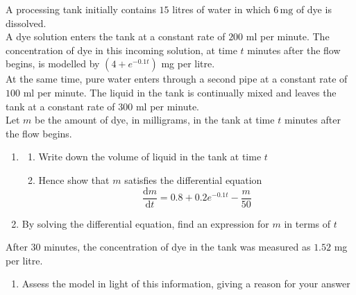 \documentclass[leqno]{article}
\begin{document}
\begin{enumerate}[
  label=\textbf{\arabic*.},
  leftmargin=*,
  topsep=0pt,
  partopsep=0pt,
  parsep=0pt
]
\newpage

\questionitem

A processing tank initially contains $15$ litres of water in which $6\,\mathrm{mg}$ of dye is dissolved. \\

A dye solution enters the tank at a constant rate of $200$ ml per minute. The concentration of dye in this incoming solution, at time $t$ minutes after the flow begins, is modelled by $(4+e^{-0.1t})$ mg per litre. \\

At the same time, pure water enters through a second pipe at a constant rate of $100$ ml per minute. The liquid in the tank is continually mixed and leaves the tank at a constant rate of $300$ ml per minute. \\

Let $m$ be the amount of dye, in milligrams, in the tank at time $t$ minutes after the flow begins. \\
\begin{enumerate}[label=\textbf{(\alph*)}]
  \item 
  \begin{enumerate}[label=(\roman*)]
    \item Write down the volume of liquid in the tank at time $t$
    \item Hence show that $m$ satisfies the differential equation
    \[
    \frac{\mathrm{d}m}{\mathrm{d}t}=0.8+0.2e^{-0.1t}-\frac{m}{50}
    \]
  \end{enumerate}
  \item By solving the differential equation, find an expression for $m$ in terms of $t$  \\
\end{enumerate}
After $30$ minutes, the concentration of dye in the tank was measured as $1.52$ mg per litre. \\
\begin{enumerate}[label=\textbf{(\alph*)}, resume]
  \item Assess the model in light of this information, giving a reason for your answer  \\
\end{enumerate}

\newpage

\questionitem


\end{enumerate}
\end{document}
